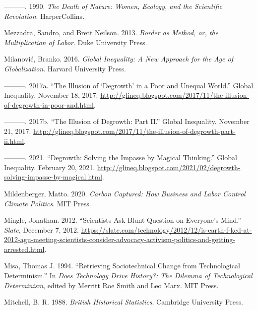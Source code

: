 \documentclass[a4paper, nobind]{templates/ociamthesis}
\newlength{\cslhangindent}
\newenvironment{CSLReferences}[2] %
 {%
  \setlength{\parindent}{0pt}
  \ifodd #1
  \let\oldpar\par
  \def\par{\hangindent=\cslhangindent\oldpar}
  \fi
  \setlength{\parskip}{1mm}
  \setlength{\baselineskip}{6mm}
 }%
 {}
\begin{document}
\begin{CSLReferences}{1}{0}
\leavevmode{}%
---------. 1990. \emph{The {Death} of {Nature}: {Women}, {Ecology}, and the {Scientific Revolution}}. {HarperCollins}.

\leavevmode{}%
Mezzadra, Sandro, and Brett Neilson. 2013. \emph{Border as {Method}, or, the {Multiplication} of {Labor}}. {Duke University Press}.

\leavevmode{}%
Milanović, Branko. 2016. \emph{Global {Inequality}: {A New Approach} for the {Age} of {Globalization}}. {Harvard University Press}.

\leavevmode{}%
---------. 2017a. {``The Illusion of {`Degrowth'} in a Poor and Unequal World.''} {Global Inequality}. November 18, 2017. \url{http://glineq.blogspot.com/2017/11/the-illusion-of-degrowth-in-poor-and.html}.

\leavevmode{}%
---------. 2017b. {``The Illusion of Degrowth: {Part II}.''} {Global Inequality}. November 21, 2017. \url{http://glineq.blogspot.com/2017/11/the-illusion-of-degrowth-part-ii.html}.

\leavevmode{}%
---------. 2021. {``Degrowth: Solving the Impasse by Magical Thinking.''} {Global Inequality}. February 20, 2021. \url{http://glineq.blogspot.com/2021/02/degrowth-solving-impasse-by-magical.html}.

\leavevmode{}%
Mildenberger, Matto. 2020. \emph{Carbon {Captured}: {How Business} and {Labor Control Climate Politics}}. {MIT Press}.

\leavevmode{}%
Mingle, Jonathan. 2012. {``Scientists {Ask Blunt Question} on {Everyone}'s {Mind}.''} \emph{Slate}, December 7, 2012. \url{https://slate.com/technology/2012/12/is-earth-f-ked-at-2012-agu-meeting-scientists-consider-advocacy-activism-politics-and-getting-arrested.html}.

\leavevmode{}%
Misa, Thomas J. 1994. {``Retrieving Sociotechnical Change from Technological Determinism.''} In \emph{Does {Technology Drive History}?: {The Dilemma} of {Technological Determinism}}, edited by Merritt Roe Smith and Leo Marx. {MIT Press}.

\leavevmode{}%
Mitchell, B. R. 1988. \emph{British {Historical Statistics}}. {Cambridge University Press}.


\end{CSLReferences}
\end{document}
